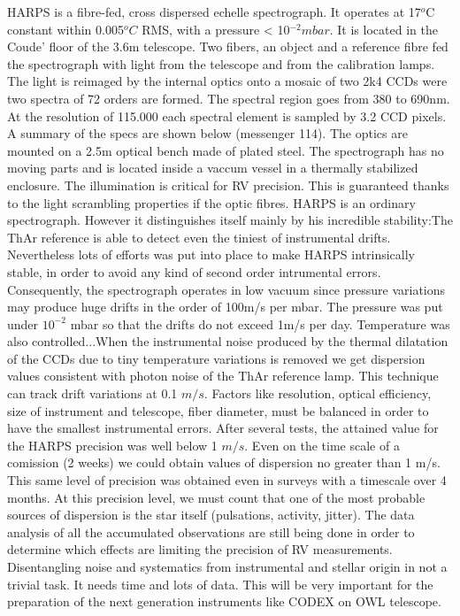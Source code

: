 \documentclass[dvips,12pt,a4paper]{report}
\begin{document}
{{HARPS is a fibre-fed, cross dispersed echelle spectrograph. It operates at 17$^o$C constant within  0.005$^oC$ RMS, with a pressure < 10$^{-2}mbar$. It is located in the Coude' floor of the 3.6m telescope. 
Two fibers, an object and a reference fibre fed the spectrograph with light from the telescope and from the calibration lamps. The light is reimaged by the internal optics onto a mosaic of two 2k4 CCDs were two spectra of 72 orders are formed. The spectral region goes from 380 to 690nm. At the resolution of 115.000 each spectral element is sampled by 3.2 CCD pixels. A summary of the specs are shown below (messenger 114). 
The optics are mounted on a 2.5m optical bench made of plated steel. The spectrograph has no moving parts and is located inside a vaccum vessel in a thermally stabilized enclosure.  
The illumination is critical for RV precision. This is guaranteed thanks to the light scrambling properties if the optic fibres. 
HARPS is an ordinary spectrograph. However it distinguishes itself mainly by his incredible stability:The ThAr reference is able to detect even the tiniest of instrumental drifts. Nevertheless lots of efforts was put into place to make HARPS intrinsically stable, in order to avoid any kind of second order intrumental errors. Consequently, the spectrograph operates in low vacuum since pressure variations may produce huge drifts in the order of 100m/s per mbar. The pressure was put under $10^{-2}$ mbar so that the drifts do not exceed 1m/s per day. Temperature was also controlled...When the instrumental noise produced by the thermal dilatation of the CCDs due to tiny temperature variations is removed we get dispersion values consistent with photon noise of the ThAr reference lamp. This technique can track drift variations at 0.1 $m/s$. Factors like resolution, optical efficiency, size of instrument and telescope, fiber diameter, must be balanced in order to have the smallest instrumental errors. 
After several tests, the attained value for the HARPS precision was well below 1 $m/s$. Even on the time scale of a comission (2 weeks) we could obtain values of dispersion no greater than 1 m/s. This same level of precision was obtained even in surveys with a timescale over 4 months. At this precision level, we must count that one of the most probable sources of dispersion is the star itself (pulsations, activity, jitter). 
The data analysis of all the accumulated observations are still being done in order to determine  which effects are limiting the precision of RV measurements. Disentangling noise and systematics from instrumental and stellar origin in not a trivial task. It needs time and lots of data. This will be very important for the preparation of the next generation instruments like CODEX on OWL telescope. 
}}
\end{document}
